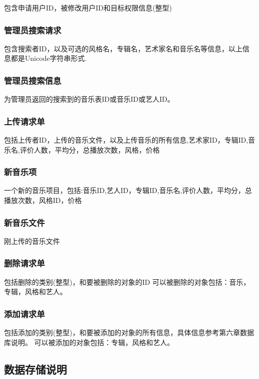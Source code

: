 包含申请用户ID，被修改用户ID和目标权限信息(整型)

\subsubsection{管理员搜索请求}

包含搜索者ID，以及可选的风格名，专辑名，艺术家名和音乐名等信息，以上信息都是Unicode字符串形式.

\subsubsection{管理员搜索信息}

为管理员返回的搜索到的音乐表ID或音乐ID或艺人ID。

\subsubsection{上传请求单}

包括上传者ID，上传的音乐文件，以及上传音乐的所有信息,艺术家ID，专辑ID,音乐名,评价人数，平均分，总播放次数，风格，价格

\subsubsection{新音乐项}

一个新的音乐项目，包括:音乐ID,艺人ID，专辑ID,音乐名,评价人数，平均分，总播放次数，风格ID，价格

\subsubsection{新音乐文件}

刚上传的音乐文件

\subsubsection{删除请求单}

包括删除的类别(整型)，和要被删除的对象的ID
可以被删除的对象包括：音乐，专辑，风格和艺人。

\subsubsection{添加请求单}


包括添加的类别(整型)，和要被添加的对象的所有信息，具体信息参考第六章数据库说明。
可以被添加的对象包括：专辑，风格和艺人。

\subsection{数据存储说明}
